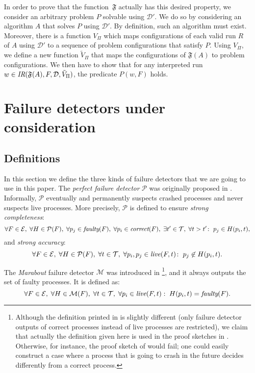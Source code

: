 \documentclass[11pt]{article}
\newcommand{\ident}[1]{\textit{#1}\rule{0cm}{1ex}}
\newcommand{\T}{\mathcal{T}}
\newcommand{\E}{\mathcal{E}}
\newcommand{\D}{\mathcal{D}}
\newcommand{\PFD}{\ensuremath{\mathcal{P}}}
\newcommand{\MFD}{\ensuremath{\mathcal{M}}}
\newcommand{\problem}{P} \newcommand{\Alg}{A}
\begin{document}
In order to prove that the function~$\mathfrak{F}$ actually has this
     desired property, we consider an arbitrary problem $\problem$
     solvable using $\D'$.
We do so by considering an algorithm $\Alg$ that solves $\problem$
     using $\D'$.
By definition, such an algorithm must exist.
Moreover, there is a function $V_\Pi$ which maps configurations of
     each valid run $R$ of $\Alg$ using $\D'$ to a sequence of problem
     configurations that satisfy $\problem$.
Using $V_\Pi$, we define a new function $\widetilde{V}_\Pi$ that maps
     the configurations of $\mathfrak{F}(\Alg)$ to problem
     configurations.
We then have to show that for any interpreted run $w \in
     \ident{IR}(\mathfrak{F}(\Alg),F,\D,\tilde{V}_\Pi)$,  the
     predicate $P(w,F)$ holds.



\section{Failure detectors under consideration}\label{sec:examples}


\subsection{Definitions}

In this section we define the three kinds of failure detectors that we
     are going to use in this paper.
The \emph{perfect failure detector} $\PFD$ was originally proposed in
     \cite{chan:ufdfr}.
Informally, $\PFD$ eventually and permanently suspects crashed
     processes and never suspects live processes.
More precisely, $\PFD$ is defined to ensure \emph{strong completeness}:   
$$
\forall F\in\E,\;\forall H\in\PFD(F),\; 
  \forall p_j\in\ident{faulty}(F),\;
\forall p_i \in \ident{correct}(F), \;
\exists t' \in \T, \;
\forall t> t'\colon \;
p_j\in H(p_i,t),
$$
and \emph{strong accuracy}:
$$
\forall F\in\E,\;\forall H\in\PFD(F),\;\forall t \in \T,\; 
\forall p_i,p_j \in \ident{live}(F,t)
\colon\;p_j\not\in H(p_i,t).
$$


The \emph{Marabout} failure detector $\MFD$ was introduced in
     \cite{guer:01:hfap}\footnote{Although the definition printed in
     \cite{guer:01:hfap} is slightly different (only failure detector
     outputs of correct processes instead of live processes are
     restricted), we claim that actually the definition given here is
     used in the proof sketches in \cite{guer:01:hfap}.
Otherwise, for instance, the proof sketch of
     \cite[Proposition~3.3]{guer:01:hfap} would fail; one could easily
     construct a case where a process that is going to crash in the
     future decides differently from a correct process.},
and it always outputs the set of faulty processes.
It is defined as:  
$$
 \forall F\in\E,\;
\forall H\in\MFD(F),\;
\forall t \in \T,\; 
\forall p_i \in \ident{live}(F,t): \;
 H(p_i,t) = \ident{faulty}(F).
$$
\end{document}
